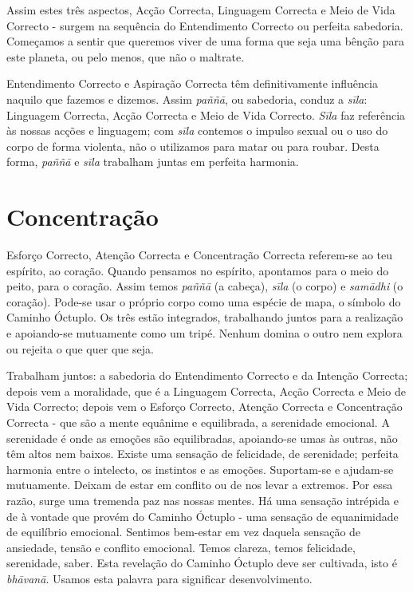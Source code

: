 Assim estes três aspectos, Acção Correcta, Linguagem Correcta e Meio de Vida
Correcto - surgem na sequência do Entendimento Correcto ou perfeita sabedoria.
Começamos a sentir que queremos viver de uma forma que seja uma bênção para este
planeta, ou pelo menos, que não o maltrate.

Entendimento Correcto e Aspiração Correcta têm definitivamente influência
naquilo que fazemos e dizemos. Assim \emph{paññā}, ou sabedoria, conduz a
\emph{sīla}: Linguagem Correcta, Acção Correcta e Meio de Vida Correcto.
\emph{Sīla} faz referência às nossas acções e linguagem; com \emph{sīla}
contemos o impulso sexual ou o uso do corpo de forma violenta, não o utilizamos
para matar ou para roubar. Desta forma, \emph{paññā} e \emph{sīla} trabalham
juntas em perfeita harmonia.

\section{Concentração}

Esforço Correcto, Atenção Correcta e Concentração Correcta referem-se ao teu
espírito, ao coração. Quando pensamos no espírito, apontamos para o meio do
peito, para o coração. Assim temos \emph{paññā} (a cabeça), \emph{sīla} (o
corpo) e \emph{samādhi} (o coração). Pode-se usar o próprio corpo como uma
espécie de mapa, o símbolo do Caminho Óctuplo. Os três estão integrados,
trabalhando juntos para a realização e apoiando-se mutuamente como um tripé.
Nenhum domina o outro nem explora ou rejeita o que quer que seja.

Trabalham juntos: a sabedoria do Entendimento Correcto e da Intenção Correcta;
depois vem a moralidade, que é a Linguagem Correcta, Acção Correcta e Meio de
Vida Correcto; depois vem o Esforço Correcto, Atenção Correcta e Concentração
Correcta - que são a mente equânime e equilibrada, a serenidade emocional. A
serenidade é onde as emoções são equilibradas, apoiando-se umas às outras, não
têm altos nem baixos. Existe uma sensação de felicidade, de serenidade; perfeita
harmonia entre o intelecto, os instintos e as emoções. Suportam-se e ajudam-se
mutuamente. Deixam de estar em conflito ou de nos levar a extremos. Por essa
razão, surge uma tremenda paz nas nossas mentes. Há uma sensação intrépida e de
à vontade que provém do Caminho Óctuplo - uma sensação de equanimidade de
equilíbrio emocional. Sentimos bem-estar em vez daquela sensação de ansiedade,
tensão e conflito emocional. Temos clareza, temos felicidade, serenidade, saber.
Esta revelação do Caminho Óctuplo deve ser cultivada, isto é \emph{bhāvanā}.
Usamos esta palavra para significar desenvolvimento.

